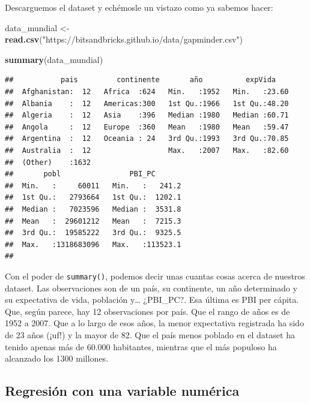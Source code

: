 \documentclass[spanish,]{book}
\newenvironment{Shaded}{\begin{snugshade}}{\end{snugshade}}
\newcommand{\KeywordTok}[1]{\textcolor[rgb]{0.13,0.29,0.53}{\textbf{#1}}}
\newcommand{\NormalTok}[1]{#1}
\newcommand{\StringTok}[1]{\textcolor[rgb]{0.31,0.60,0.02}{#1}}
\begin{document}
Descarguemos el dataset y echémosle un vistazo como ya sabemos hacer:

\begin{Shaded}
\begin{Highlighting}[]
\NormalTok{data_mundial <-}\StringTok{ }\KeywordTok{read.csv}\NormalTok{(}\StringTok{"https://bitsandbricks.github.io/data/gapminder.csv"}\NormalTok{)}

\KeywordTok{summary}\NormalTok{(data_mundial)}
\end{Highlighting}
\end{Shaded}

\begin{verbatim}
##           pais         continente       año          expVida     
##  Afghanistan:  12   Africa  :624   Min.   :1952   Min.   :23.60  
##  Albania    :  12   Americas:300   1st Qu.:1966   1st Qu.:48.20  
##  Algeria    :  12   Asia    :396   Median :1980   Median :60.71  
##  Angola     :  12   Europe  :360   Mean   :1980   Mean   :59.47  
##  Argentina  :  12   Oceania : 24   3rd Qu.:1993   3rd Qu.:70.85  
##  Australia  :  12                  Max.   :2007   Max.   :82.60  
##  (Other)    :1632                                                
##       pobl                PBI_PC        
##  Min.   :     60011   Min.   :   241.2  
##  1st Qu.:   2793664   1st Qu.:  1202.1  
##  Median :   7023596   Median :  3531.8  
##  Mean   :  29601212   Mean   :  7215.3  
##  3rd Qu.:  19585222   3rd Qu.:  9325.5  
##  Max.   :1318683096   Max.   :113523.1  
## 
\end{verbatim}

Con el poder de \texttt{summary()}, podemos decir unas cuantas cosas acerca de nuestros dataset. Las observaciones son de un país, su continente, un año determinado y su expectativa de vida, población y\ldots{} ¿PBI\_PC?. Esa última es PBI per cápita. Que, según parece, hay 12 observaciones por país. Que el rango de años es de 1952 a 2007. Que a lo largo de esos años, la menor expectativa registrada ha sido de 23 años (¡uf!) y la mayor de 82. Que el país menos poblado en el dataset ha tenido apenas más de 60.000 habitantes, mientras que el más populoso ha alcanzado los 1300 millones.

\hypertarget{regresion-con-una-variable-numerica}{%
\subsection{Regresión con una variable numérica}\label{regresion-con-una-variable-numerica}}
\end{document}
